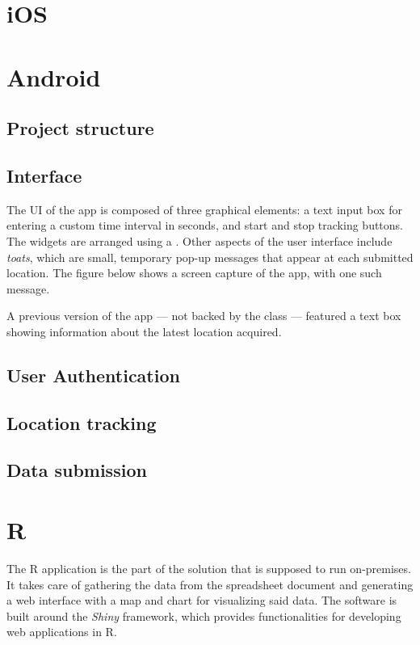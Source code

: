 \section{iOS}



\section{Android}


\subsection{Project structure}

\subsection{Interface}
The UI of the app is composed of three graphical elements: a text input box for entering a custom time interval in seconds, and start and stop tracking buttons.
The widgets are arranged using a .
Other aspects of the user interface include \emph{toats}, which are small, temporary pop-up messages that appear at each submitted location.
The figure below shows a screen capture of the app, with one such message.


A previous version of the app --- not backed by the  class --- featured a text box showing information about the latest location acquired.


\subsection{User Authentication}


\subsection{Location tracking}


\subsection{Data submission}



\section{R}
The R application is the part of the solution that is supposed to run on-premises.
It takes care of gathering the data from the spreadsheet document and generating a web interface with a map and chart for visualizing said data.
The software is built around the \emph{Shiny} framework, which provides functionalities for developing web applications in R.


